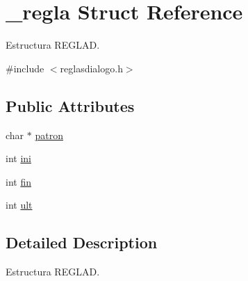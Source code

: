 \hypertarget{struct__regla}{
\section{\_\-regla Struct Reference}
\label{struct__regla}
}


Estructura REGLAD.  




{\ttfamily \#include $<$reglasdialogo.h$>$}

\subsection*{Public Attributes}
\begin{DoxyCompactItemize}
\item 
char $\ast$ \hyperlink{struct__regla_a4fe5bb672ccf9cc7790a3a0a0e5aabe6}{patron}
\item 
int \hyperlink{struct__regla_aa7a3d16b7fd1b9f310e9d65d90c761ba}{ini}
\item 
int \hyperlink{struct__regla_a047469b6b7102bdbc383db5192269bdd}{fin}
\item 
int \hyperlink{struct__regla_a5b2ecb01c9f5e03d33be5e330bcc16d3}{ult}
\end{DoxyCompactItemize}


\subsection{Detailed Description}
Estructura REGLAD. 

